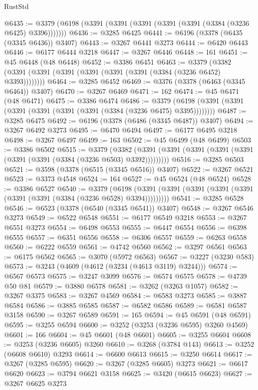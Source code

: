 \begin{lexlean}{RustStd}
\begin{coremodule}
@6435 := @3379 (@6198 (@3391 (@3391 (@3391 (@3391 (@3391 (@3384 (@3236 @6425) @3396)))))))
@6436 := @3285 @6425
@6441 := @6196 (@3378 (@6435 (@3345 @6436)) @3407)
@6443 := @3267 @6441 @3273
@6444 := @6420 @6443
@6446 := @6177 @6444 @3218
@6447 := @3267 @6446
@6448 := 161
@6451 := @45 @6448 (@48 @6448)
@6452 := @3386 @6451
@6463 := @3379 (@3382 (@3391 (@3391 (@3391 (@3391 (@3391 (@3391 (@3384 (@3236 @6452) @3393))))))))
@6464 := @3285 @6452
@6469 := @3376 (@3378 (@6463 (@3345 @6464)) @3407)
@6470 := @3267 @6469
@6471 := 162
@6474 := @45 @6471 (@48 @6471)
@6475 := @3386 @6474
@6486 := @3379 (@6198 (@3391 (@3391 (@3391 (@3391 (@3391 (@3391 (@3384 (@3236 @6475) @3395))))))))
@6487 := @3285 @6475
@6492 := @6196 (@3378 (@6486 (@3345 @6487)) @3407)
@6494 := @3267 @6492 @3273
@6495 := @6470 @6494
@6497 := @6177 @6495 @3218
@6498 := @3267 @6497
@6499 := 163
@6502 := @45 @6499 (@48 @6499)
@6503 := @3386 @6502
@6515 := @3379
    (@3382 (@3391 (@3391 (@3391 (@3391 (@3391 (@3391 (@3391 (@3384 (@3236 @6503) @3392)))))))))
@6516 := @3285 @6503
@6521 := @3598 (@3378 (@6515 (@3345 @6516)) @3407)
@6522 := @3267 @6521
@6523 := @3373 @4548
@6524 := 164
@6527 := @45 @6524 (@48 @6524)
@6528 := @3386 @6527
@6540 := @3379
    (@6198 (@3391 (@3391 (@3391 (@3391 (@3391 (@3391 (@3391 (@3384 (@3236 @6528) @3394)))))))))
@6541 := @3285 @6528
@6546 := @6523 (@3378 (@6540 (@3345 @6541)) @3407)
@6548 := @3267 @6546 @3273
@6549 := @6522 @6548
@6551 := @6177 @6549 @3218
@6553 := @3267 @6551 @3273
@6554 := @6498 @6553
@6555 := @6447 @6554
@6556 := @6398 @6555
@6557 := @6351 @6556
@6558 := @6306 @6557
@6559 := @6263 @6558
@6560 := @6222 @6559
@6561 := @4742 @6560
@6562 := @3297 @6561
@6563 := @6175 @6562
@6565 := @3070 (@5972 @6563)
@6567 := @3227 (@3230 @583)
@6573 := @3243 (@4609 (@4612 (@3234 (@4613 @3119) @3244)))
@6574 := @6567 @6573
@6575 := @3247 @3099
@6576 := @6574 @6575
@6578 := @4739 @50 @81
@6579 := @3880 @6578
@6581 := @3262 (@3263 @1057)
@6582 := @3267 @3375
@6583 := @3267 @4569
@6584 := @6583 @3273
@6585 := @3887 @6584
@6586 := @3885 @6585
@6587 := @6582 @6586
@6589 := @6581 @6587 @3158
@6590 := @3267 @6589
@6591 := 165
@6594 := @45 @6591 (@48 @6591)
@6595 := @3255 @6594
@6600 := @3252 (@3253 (@3236 @6595) @3260 @4569)
@6601 := 166
@6604 := @45 @6601 (@48 @6601)
@6605 := @3255 @6604
@6608 := @3253 (@3236 @6605) @3260
@6610 := @3268 (@3784 @143)
@6613 := @3252 (@6608 @6610) @3293
@6614 := @6600 @6613
@6615 := @3250 @6614
@6617 := @3267 (@3285 @6595)
@6620 := @3267 (@3285 @6605) @3273
@6621 := @6617 @6620
@6623 := @3794 @6621 @3158
@6625 := @3420 (@6615 @6623)
@6627 := @3267 @6625 @3273

\end{coremodule}
\end{lexlean}

